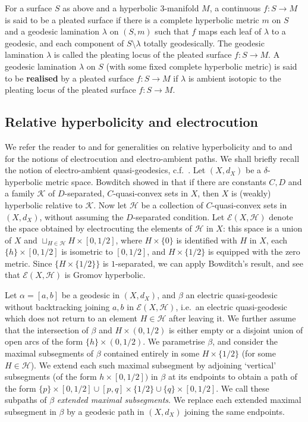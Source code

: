 \documentclass{amsart}
\theoremstyle{definition}
\newcommand\EE{{\mathcal E}}
\newcommand\HH{{\mathcal H}}
\newcommand\EXH{{ \EE (X, \HH )}}
\begin{document}
For a  surface $S$ as above and a hyperbolic 3-manifold $M$, a continuous $f \colon S \to M$ is said to be a pleated surface if there is a complete hyperbolic metric $m$ on $S$ and a geodesic lamination $\lambda$ on
$(S,m)$ such that $f$ maps each leaf of $\lambda$ to a geodesic, and each component of $S \setminus \lambda$ totally geodesically. The geodesic lamination $\lambda$ is called the pleating locus of the pleated surface
$f \colon S \to M$.
A geodesic lamination $\lambda$ on $S$ (with some fixed complete hyperbolic metric) is said to be {\bf realised} by a pleated surface $f \colon S \to M$ if 
$\lambda$ is ambient isotopic to the pleating locus of the pleated surface
$f \colon S \to M$. 



\subsection{Relative hyperbolicity and electrocution} 
\label{rel hyp}
We refer the reader to \cite{farb-relhyp} and \cite{bowditch-relhyp} for generalities on relative hyperbolicity and to \cite{mahan-ibdd} and \cite{mahan-split} for the notions of electrocution and electro-ambient paths. 
We shall briefly recall the notion of electro-ambient quasi-geodesics, c.f.\ \cite{mahan-split}.
Let $(X,d_X)$ be a $\delta$-hyperbolic metric
space. 
Bowditch showed in \cite{bowditch-relhyp} that if there are constants $C, D$ and a family $\mathcal K$ of $D$-separated, $C$-quasi-convex sets in $X$, then $X$ is (weakly) hyperbolic relative to $\mathcal K$.
Now let $\mathcal H$ be a collection of $C$-quasi-convex sets in $(X, d_X)$, without assuming the $D$-separated condition.
 Let $\EXH$ denote the  space obtained by electrocuting the elements of $\mathcal H$ in $X$: this space is a union of $X$ and $\sqcup_{H\in \mathcal H} H \times [0,1/2]$, where $H \times \{0\}$ is identified with $H$ in $X$, each $\{h\} \times [0,1/2]$ is isometric to $ [0,1/2]$, and $H \times \{1/2\}$ is equipped with the zero metric.
Since $\{H \times \{1/2\}\}$ is $1$-separated, we can apply Bowditch's result, and see that $\EXH$ is Gromov hyperbolic.

Let $\alpha = [a,b]$ be a geodesic in $(X,d_X)$, and 
$\beta $ 
an electric 
quasi-geodesic without backtracking 
joining $a, b$ in $\EXH$, i.e.\ an electric quasi-geodesic which does not return to an element $H \in \HH$ after leaving it. 
We further assume that the intersection of $\beta$ and $H \times (0,1/2)$ is either empty or a disjoint union of open arcs of the form $\{h\} \times (0,1/2)$.
We parametrise $\beta$, and consider the maximal subsegments of $\beta$
contained entirely in some $H \times \{1/2\}$ (for  some $H \in \mathcal{H}$). 
We extend each  such maximal subsegment  by adjoining `vertical' subsegments (of the form $h \times [0, 1/2])$ in $\beta$ at  its endpoints
to obtain a path of the form $\{ p \} \times [0,1/2]\cup [p, q]\times\{1/2\}
 \cup \{ q \} \times [0,1/2]$.
 We call 
these subpaths of $\beta$ {\it  extended  maximal subsegments}.
We replace each extended  maximal subsegment  in $\beta$
by a   geodesic path in $(X,d_X)$ joining the same endpoints.
\end{document}

